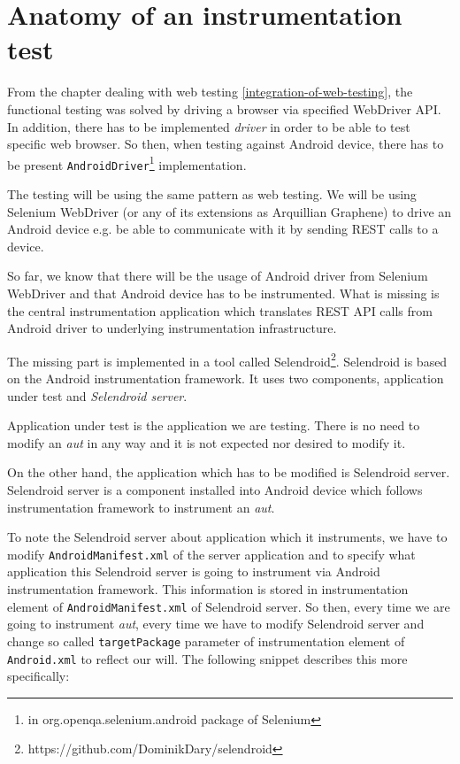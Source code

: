 \documentclass[12pt,final,oneside]{fithesis}
\begin{document}
    \section{Anatomy of an instrumentation test}

From the chapter dealing with web testing \ref{integration-of-web-testing}, the functional testing was solved by driving a browser via specified WebDriver API. In addition, there has to be implemented \textit{driver} in order to be able to test specific web browser. So then, when testing against Android device, there has to be present \texttt{AndroidDriver}\footnote{in org.openqa.selenium.android package of Selenium} implementation.

The testing will be using the same pattern as web testing. We will be using Selenium WebDriver (or any of its extensions as Arquillian Graphene) to drive an Android device e.g. be able to communicate with it by sending REST calls to a device.

So far, we know that there will be the usage of Android driver from Selenium WebDriver and that Android device has to be instrumented. What is missing is the central instrumentation application which translates REST API calls from Android driver to underlying instrumentation infrastructure.

The missing part is implemented in a tool called Selendroid\footnote{https://github.com/DominikDary/selendroid}. Selendroid is based on the Android instrumentation framework. It uses two components, application under test and \textit{Selendroid server}.

Application under test is the application we are testing. There is no need to modify an \textit{aut} in any way and it is not expected nor desired to modify it.

On the other hand, the application which has to be modified is Selendroid server. Selendroid server is a component installed into Android device which follows instrumentation framework to instrument an \textit{aut}.

To note the Selendroid server about application which it instruments, we have to modify \texttt{AndroidManifest.xml} of the server application and to specify what application this Selendroid server is going to instrument via Android instrumentation framework. This information is stored in instrumentation element of \texttt{AndroidManifest.xml} of Selendroid server. So then, every time we are going to instrument \textit{aut}, every time we have to modify Selendroid server and change so called \texttt{targetPackage} parameter of instrumentation element of \texttt{Android.xml} to reflect our will. The following snippet describes this more specifically:
\end{document}
